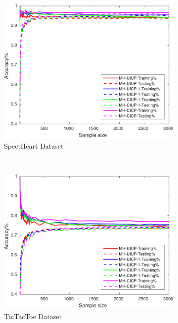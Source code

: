 \begin{figure}[ht]
\begin{subfigure}[b]{0.3\textwidth}
  	\includegraphics[width=\textwidth]{figs/PLPTF/Trees/SpectHeartDownsampledFurther_Trees_MH.pdf}
  	\caption{SpectHeart Dataset}
		\label{fig:S2}
	\end{subfigure}
  \\
  \begin{subfigure}[b]{0.3\textwidth}
		\centering
  	\includegraphics[width=\textwidth]{figs/PLPTF/Trees/TicTacToe_Trees_MH.pdf}
  	\caption{TicTacToe Dataset}
		\label{fig:T2}
	\end{subfigure}
  \begin{subfigure}[b]{0.3\textwidth}
		\centering

\end{subfigure}
\end{figure}
